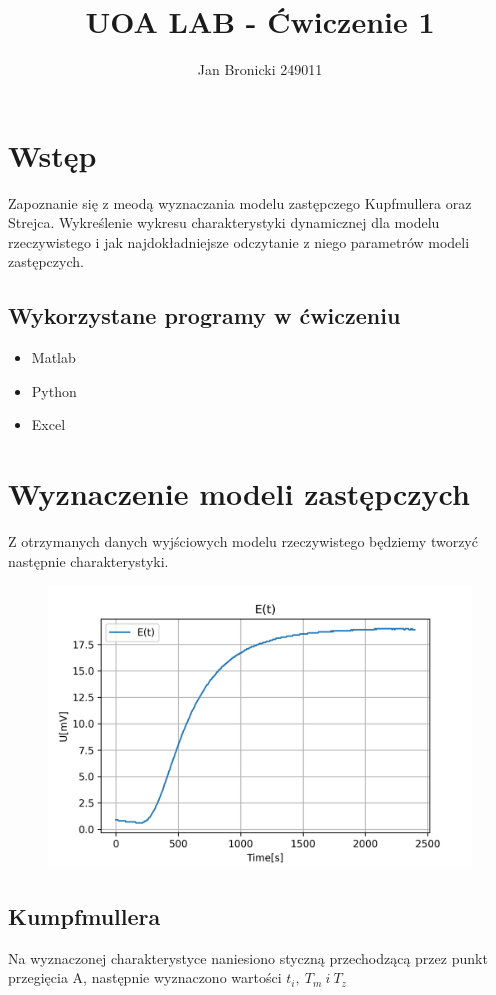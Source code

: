\documentclass{article}
\title{UOA LAB - Ćwiczenie 1}
\author{Jan Bronicki 249011}
\date{}
\begin{document}
\maketitle


\section{Wstęp}
Zapoznanie się z meodą wyznaczania modelu zastępczego Kupfmullera oraz Strejca. Wykreślenie wykresu charakterystyki
dynamicznej dla modelu rzeczywistego i jak najdokładniejsze odczytanie z niego parametrów modeli zastępczych.
\subsection{Wykorzystane programy w ćwiczeniu}
\begin{itemize}
    \item Matlab
    \item Python
    \item Excel
\end{itemize}

\section{Wyznaczenie modeli zastępczych}
Z otrzymanych danych wyjściowych modelu rzeczywistego będziemy tworzyć następnie charakterystyki.

\begin{figure}[h!]
    \centering
    \includegraphics[scale=0.7]{oryginal.png}
\end{figure}

\newpage

\subsection{Kumpfmullera}
Na wyznaczonej charakterystyce naniesiono styczną przechodzącą przez punkt przegięcia A, następnie wyznaczono wartości $t_{i}, \ T_{m} \ i \ T_{z}$
\end{document}
